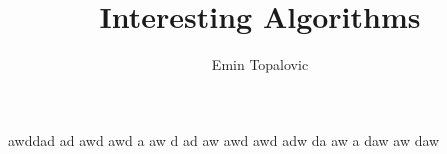 \documentclass[10pt,a4paper,twocolumn,titlepage]{book}
\author{Emin Topalovic}
\title{Interesting Algorithms}
\begin{document}
\maketitle
\begin{multicols}{2}
awddad ad awd awd a aw d ad aw awd awd adw da aw a daw aw daw 
\end{multicols}
\end{document}

